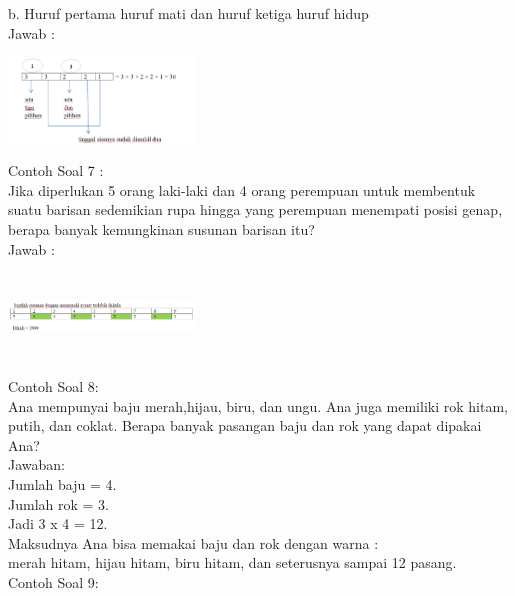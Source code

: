 \documentclass[11pt,fleqn]{book} %
\begin{document}
b.      Huruf pertama huruf mati dan huruf ketiga huruf hidup\\

Jawab :\\

\includegraphics[width = 5cm, height=3cm]{Pictures/soalkaidah2.png}\\

Contoh Soal 7 :\\

Jika diperlukan 5 orang laki-laki dan 4 orang perempuan untuk membentuk suatu barisan sedemikian rupa hingga yang perempuan menempati posisi genap, berapa banyak kemungkinan susunan barisan itu?\\

Jawab :\\

\includegraphics[width = 5cm, height=3cm]{Pictures/soalkaidah3.png}\\

Contoh Soal 8:\\

Ana mempunyai baju merah,hijau, biru, dan ungu. Ana juga memiliki rok hitam, putih, dan coklat. Berapa banyak pasangan baju dan rok yang dapat dipakai Ana?\\

Jawaban:\\

Jumlah baju = 4. \\
Jumlah rok = 3.\\
 Jadi 3 x 4 = 12.\\
 Maksudnya Ana bisa memakai baju dan rok dengan warna : \\
merah hitam, hijau hitam, biru hitam, dan seterusnya sampai 12 pasang.\\

Contoh Soal 9: \\
\end{document}
